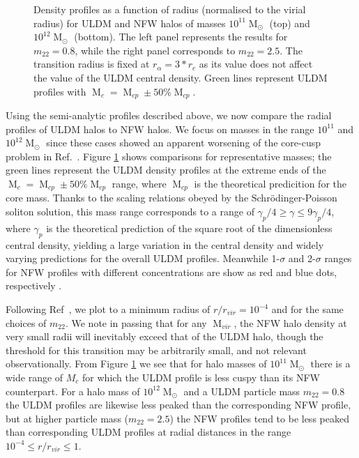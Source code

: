 \documentclass[a4paper,11pt]{article}
\begin{document}
\begin{figure}
\begin{tabular}{cc}
\end{tabular}
\caption{Density profiles as a function of radius (normalised to the virial radius) for ULDM and NFW halos of masses $10^{11}\operatorname{M}_{\odot}$ (top) and $10^{12}\operatorname{M}_{\odot}$ (bottom). The left panel represents the results for $m_{22} = 0.8$, while the right panel corresponds to $m_{22}=2.5$. The transition radius is fixed at $r_{\alpha} = 3*r_c$ as its value does not affect the value of the ULDM central density. Green lines represent  ULDM profiles with $\operatorname{M}_c = \operatorname{M}_{cp} \pm 50 \% \operatorname{M}_{cp}$.}\label{fig:profiles}
\end{figure}

 
Using the semi-analytic profiles described above, we now compare the radial profiles of ULDM halos to NFW halos. We focus on masses in the range $10^{11}$ and $10^{12} \operatorname{M}_{\odot}$ since these cases showed an apparent worsening of the core-cusp problem in Ref.~\cite{Robles:2018fur}. Figure \ref{fig:profiles} shows comparisons for representative masses; the green lines represent the ULDM density profiles at the extreme ends of the $\operatorname{M}_c = \operatorname{M}_{cp} \pm 50 \% \operatorname{M}_{cp}$ range, where $\operatorname{M}_{cp}$ is the theoretical predicition for the core mass. Thanks to the scaling relations obeyed by the Schr{\"o}dinger-Poisson soliton solution, this mass range corresponds to a range of $ \gamma_p /4 \geq \gamma \leq 9\gamma_p/4$, where $\gamma_p$ is the theoretical prediction of the square root of the dimensionless central density, yielding a large variation in the central density and widely varying predictions for the overall ULDM profiles. Meanwhile  1-$\sigma$ and 2-$\sigma$ ranges for NFW profiles with different concentrations are show as red and blue dots, respectively \cite{Maccio:2008pcd}. 

Following Ref~\cite{Robles:2018fur}, we plot to a minimum radius of $r/r_{vir} = 10^{-4}$ and for the same choices of $m_{22}$. We note in passing that for any $\operatorname{M}_{vir}$, the NFW halo density at very small radii will inevitably exceed that of the ULDM halo, though the threshold for this transition may be arbitrarily small, and not relevant observationally.  From Figure \ref{fig:profiles} we see that for halo masses of $10^{11}\operatorname{M}_{\odot}$ there is a wide range of $M_c$ for which the ULDM profile is less cuspy than its NFW counterpart.  For a halo mass of $10^{12}\operatorname{M}_{\odot}$ and a ULDM particle mass $m_{22}=0.8$ the ULDM profiles are likewise less peaked than the corresponding NFW profile, but at higher particle mass ($m_{22}=2.5$) the  NFW profiles tend to be less peaked than corresponding ULDM profiles at radial distances in  the range $10^{-4}\leq r/r_{vir} \leq 1$.
\end{document}
